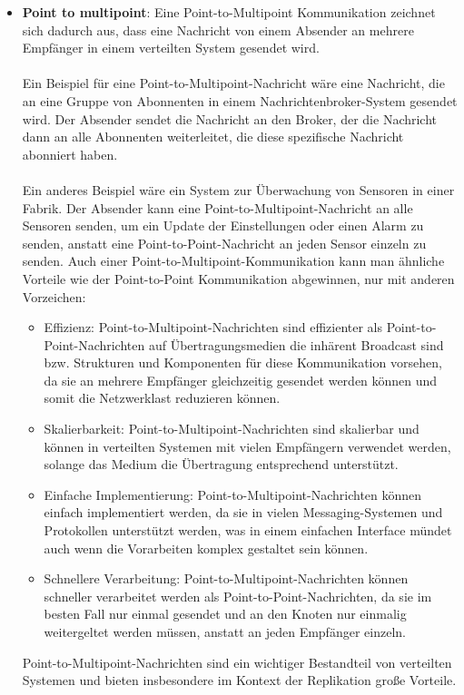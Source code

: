 \documentclass[../vs-script-first-v01.tex]{subfiles}
\begin{document}
\begin{itemize}
\item \textbf{Point to multipoint}: Eine Point-to-Multipoint Kommunikation zeichnet sich dadurch aus, dass eine Nachricht von einem Absender an mehrere Empfänger in einem verteilten System gesendet wird. 
\\\\
Ein Beispiel für eine Point-to-Multipoint-Nachricht wäre eine Nachricht, die an eine Gruppe von Abonnenten in einem Nachrichtenbroker-System gesendet wird. Der Absender sendet die Nachricht an den Broker, der die Nachricht dann an alle Abonnenten weiterleitet, die diese spezifische Nachricht abonniert haben.
\\\\
Ein anderes Beispiel wäre ein System zur Überwachung von Sensoren in einer Fabrik. Der Absender kann eine Point-to-Multipoint-Nachricht an alle Sensoren senden, um ein Update der Einstellungen oder einen Alarm zu senden, anstatt eine Point-to-Point-Nachricht an jeden Sensor einzeln zu senden.  Auch einer Point-to-Multipoint-Kommunikation kann man ähnliche Vorteile wie der Point-to-Point Kommunikation abgewinnen, nur mit anderen Vorzeichen:
\begin{itemize}
\item Effizienz: Point-to-Multipoint-Nachrichten sind effizienter als Point-to-Point-Nachrichten auf Übertragungsmedien die inhärent Broadcast sind bzw. Strukturen und Komponenten für diese Kommunikation vorsehen, da sie an mehrere Empfänger gleichzeitig gesendet werden können und somit die Netzwerklast reduzieren können.
\item Skalierbarkeit: Point-to-Multipoint-Nachrichten sind skalierbar und können in verteilten Systemen mit vielen Empfängern verwendet werden, solange das Medium die Übertragung entsprechend unterstützt.
\item Einfache Implementierung: Point-to-Multipoint-Nachrichten können einfach implementiert werden, da sie in vielen Messaging-Systemen und Protokollen unterstützt werden, was in einem einfachen Interface mündet auch wenn die Vorarbeiten komplex gestaltet sein können.
\item Schnellere Verarbeitung: Point-to-Multipoint-Nachrichten können schneller verarbeitet werden als Point-to-Point-Nachrichten, da sie im besten Fall nur einmal gesendet und an den Knoten nur einmalig weitergeltet werden müssen, anstatt an jeden Empfänger einzeln.
\end{itemize}
Point-to-Multipoint-Nachrichten sind ein wichtiger Bestandteil von verteilten Systemen und bieten insbesondere im Kontext der Replikation große Vorteile.

\end{itemize}
\end{document}
